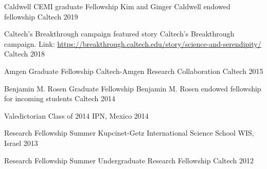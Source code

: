 


\begin{cvhonors}

  \cvhonor
    {Caldwell CEMI graduate Fellowship} %
    {Kim and Ginger Caldwell endowed fellowship} %
    {Caltech} %
    {2019} %

  \cvhonor
    {Caltech's Breakthrough campaign featured story}
    {Caltech's Breakthrough campaign. Link:
    \url{https://breakthrough.caltech.edu/story/science-and-serendipity/}} %
    {Caltech} %
    {2018} %

  \cvhonor
    {Amgen Graduate Fellowship} %
    {Caltech-Amgen Research Collaboration} %
    {Caltech} %
    {2015} %

  \cvhonor
    {Benjamin M. Rosen Graduate Fellowship} %
    {Benjamin M. Rosen endowed fellowship for incoming students} %
    {Caltech} %
    {2014} %

\end{cvhonors}
\pagebreak
{}
\begin{cvhonors}

  \cvhonor
    {Valedictorian} %
    {Class of 2014} %
    {IPN, Mexico} %
    {2014} %

  \cvhonor
    {Research Fellowship}
    {Summer Kupcinet-Getz International Science School}
    {WIS, Israel} %
    {2013} %

  \cvhonor
    {Research Fellowship}
    {Summer Undergraduate Research Fellowship}
    {Caltech} %
    {2012} %
\end{cvhonors}
